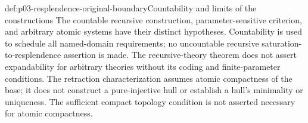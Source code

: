 \begin{proofboundary}{def:p03-resplendence-original-boundary}{Countability and limits of the constructions}
The countable recursive construction, parameter-sensitive criterion, and
arbitrary atomic systems have their distinct hypotheses. Countability is
used to schedule all named-domain requirements; no uncountable recursive
saturation-to-resplendence assertion is made. The recursive-theory theorem
does not assert expandability for arbitrary theories without its coding
and finite-parameter conditions. The retraction characterization assumes
atomic compactness of the base; it does not construct a pure-injective
hull or establish a hull's minimality or uniqueness. The sufficient compact
topology condition is not asserted necessary for atomic compactness.
\end{proofboundary}
